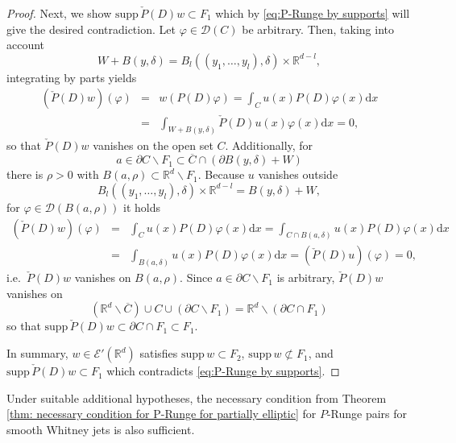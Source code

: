 \documentclass[a4paper,10pt]{amsart}
\newtheorem*{crucial lemma}{Lemma \ref{lem:nice polynomial2}}
\theoremstyle{definition}
\newcommand{\R}{\mathbb{R}}
\newcommand{\supp}{\mbox{supp}\,}
\begin{document}
\begin{proof}
	Next, we show $\supp\check{P}(D)w\subset F_1$ which by \eqref{eq:P-Runge by supports} will give the desired contradiction. Let $\varphi\in\mathscr{D}(C)$ be arbitrary. Then, taking into account
	\[W+B(y,\delta)=B_l((y_1,\ldots,y_l),\delta)\times\R^{d-l},\]
	integrating by parts yields
	\begin{eqnarray*}
		\left(\check{P}(D)w\right)(\varphi)&=&w\left(P(D)\varphi\right)=\int_Cu(x)P(D)\varphi(x)\mathrm{d}x\\
		&=&\int_{W+B(y,\delta)}\check{P}(D)u(x)\varphi(x)\mathrm{d}x=0,
	\end{eqnarray*}
	so that $\check{P}(D)w$ vanishes on the open set $C$. Additionally, for 
	\[a\in\partial C\backslash F_1\subset\overline{C}\cap\left(\partial B(y,\delta)+W\right)\]
	there is $\rho>0$ with $B(a,\rho)\subset \R^d\backslash F_1$. Because $u$ vanishes outside
	\[B_l((y_1,\ldots,y_l),\delta)\times\R^{d-l}= B(y,\delta)+W,\]
	for $\varphi\in\mathscr{D}(B(a,\rho))$ it holds
	\begin{eqnarray*}
		\left(\check{P}(D)w\right)(\varphi)&=&\int_C u(x)P(D)\varphi(x)\mathrm{d}x=\int_{C\cap B(a,\delta)}u(x)P(D)\varphi(x)\mathrm{d}x\\
		&=&\int_{B(a,\delta)}u(x)P(D)\varphi(x)\mathrm{d}x=\left(\check{P}(D)u\right)(\varphi)=0,
	\end{eqnarray*}
	i.e.~$\check{P}(D)w$ vanishes on $B(a,\rho)$. Since $a\in\partial C\backslash F_1$ is arbitrary, $\check{P}(D)w$ vanishes on
	\[\left(\R^d\backslash\overline{C}\right)\cup C\cup \left(\partial C\backslash F_1\right)=\R^d\backslash\left(\partial C\cap F_1\right)\]
	so that $\supp\check{P}(D)w\subset \partial C\cap F_1\subset F_1$.

    In summary, $w\in\mathscr{E}'(\R^d)$ satisfies $\supp w\subset F_2$, $\supp w\not\subset F_1$, and $\supp\check{P}(D)w\subset F_1$ which contradicts \eqref{eq:P-Runge by supports}.	
\end{proof}

Under suitable additional hypotheses, the necessary condition from Theorem \ref{thm: necessary condition for P-Runge for partially elliptic} for $P$-Runge pairs for smooth Whitney jets is also sufficient.
\end{document}
